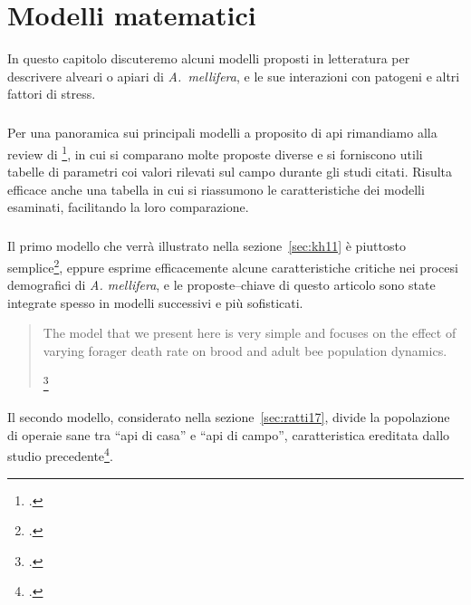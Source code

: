 \chapter{Modelli matematici}
\label{chap:modelz}
\begin{flushright}
    \small
\end{flushright}

In questo capitolo discuteremo alcuni modelli proposti in letteratura per descrivere alveari o apiari di
\emph{A.~mellifera}, e le sue interazioni con patogeni e altri fattori di stress.

\paragraph{}
Per una panoramica sui principali modelli a proposito di api rimandiamo alla review di
\citeauthor{chen_review}\footcite{chen_review}, in cui si comparano molte proposte diverse e si forniscono utili
tabelle di parametri coi valori rilevati sul campo durante gli studi citati.
Risulta efficace anche una tabella in cui si riassumono le caratteristiche dei modelli esaminati, facilitando
la loro comparazione.

\paragraph{}
Il primo modello che verrà illustrato nella sezione~\ref{sec:kh11} è piuttosto
semplice\footcite{khoury2011}, eppure esprime efficacemente alcune
caratteristiche critiche nei procesi demografici di \emph{A. mellifera}, e le proposte--chiave di questo
articolo sono state integrate spesso in modelli successivi e più sofisticati.

\blockquote[{\footcite[4]{khoury2011}}]{The model that we present here is very simple and focuses on the effect
of varying forager death rate on brood and adult bee population dynamics.}

\paragraph{}
Il secondo modello, considerato nella sezione~\ref{sec:ratti17}, divide la popolazione di
operaie sane tra ``api di casa''
e ``api di campo'', caratteristica ereditata dallo studio precedente\footcite{khoury2011}.

